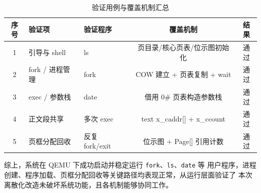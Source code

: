 \begin{table}[H]
  \centering
  \caption{验证用例与覆盖机制汇总}
  \label{tab:test-summary}
  \begin{tabular}{cllcc}
    \toprule
    序号 & 验证项 & 验证程序 & 覆盖机制 & 结果 \\
    \midrule
    1 & 引导与 shell    & ls             & 页目录/核心页表/位示图初始化 & 通过 \\
    2 & fork / 进程管理 & fork           & COW 建立 + 页表复制 + wait   & 通过 \\
    3 & exec / 参数栈   & date           & 借用 0\# 页表构造参数栈      & 通过 \\
    4 & 正文段共享      & 多次 exec      & text x\_caddr[] + x\_ccount  & 通过 \\
    5 & 页框分配回收    & 反复 fork/exit & 位示图 + Page[] 引用计数     & 通过 \\
    \bottomrule
  \end{tabular}
\end{table}

综上，系统在 QEMU 下成功启动并稳定运行 \texttt{fork}、\texttt{ls}、\texttt{date} 等
用户程序，进程创建、程序加载、页框分配回收等关键路径均表现正常，从运行层面验证了
本次离散化改造未破坏系统功能，且各机制能够协同工作。
